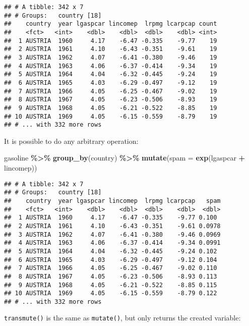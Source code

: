 \documentclass[
]{article}
\newenvironment{Shaded}{\begin{snugshade}}{\end{snugshade}}
\newcommand{\DataTypeTok}[1]{\textcolor[rgb]{0.13,0.29,0.53}{#1}}
\newcommand{\KeywordTok}[1]{\textcolor[rgb]{0.13,0.29,0.53}{\textbf{#1}}}
\newcommand{\NormalTok}[1]{#1}
\newcommand{\OperatorTok}[1]{\textcolor[rgb]{0.81,0.36,0.00}{\textbf{#1}}}
\newcommand{\StringTok}[1]{\textcolor[rgb]{0.31,0.60,0.02}{#1}}
\begin{document}
\begin{verbatim}
## # A tibble: 342 x 7
## # Groups:   country [18]
##    country  year lgaspcar lincomep  lrpmg lcarpcap count
##    <fct>   <int>    <dbl>    <dbl>  <dbl>    <dbl> <int>
##  1 AUSTRIA  1960     4.17    -6.47 -0.335    -9.77    19
##  2 AUSTRIA  1961     4.10    -6.43 -0.351    -9.61    19
##  3 AUSTRIA  1962     4.07    -6.41 -0.380    -9.46    19
##  4 AUSTRIA  1963     4.06    -6.37 -0.414    -9.34    19
##  5 AUSTRIA  1964     4.04    -6.32 -0.445    -9.24    19
##  6 AUSTRIA  1965     4.03    -6.29 -0.497    -9.12    19
##  7 AUSTRIA  1966     4.05    -6.25 -0.467    -9.02    19
##  8 AUSTRIA  1967     4.05    -6.23 -0.506    -8.93    19
##  9 AUSTRIA  1968     4.05    -6.21 -0.522    -8.85    19
## 10 AUSTRIA  1969     4.05    -6.15 -0.559    -8.79    19
## # ... with 332 more rows
\end{verbatim}

It is possible to do any arbitrary operation:

\begin{Shaded}
\begin{Highlighting}[]
\NormalTok{gasoline }\OperatorTok{\%\textgreater{}\%}
\StringTok{  }\KeywordTok{group\_by}\NormalTok{(country) }\OperatorTok{\%\textgreater{}\%}
\StringTok{  }\KeywordTok{mutate}\NormalTok{(}\DataTypeTok{spam =} \KeywordTok{exp}\NormalTok{(lgaspcar }\OperatorTok{+}\StringTok{ }\NormalTok{lincomep))}
\end{Highlighting}
\end{Shaded}

\begin{verbatim}
## # A tibble: 342 x 7
## # Groups:   country [18]
##    country  year lgaspcar lincomep  lrpmg lcarpcap   spam
##    <fct>   <int>    <dbl>    <dbl>  <dbl>    <dbl>  <dbl>
##  1 AUSTRIA  1960     4.17    -6.47 -0.335    -9.77 0.100 
##  2 AUSTRIA  1961     4.10    -6.43 -0.351    -9.61 0.0978
##  3 AUSTRIA  1962     4.07    -6.41 -0.380    -9.46 0.0969
##  4 AUSTRIA  1963     4.06    -6.37 -0.414    -9.34 0.0991
##  5 AUSTRIA  1964     4.04    -6.32 -0.445    -9.24 0.102 
##  6 AUSTRIA  1965     4.03    -6.29 -0.497    -9.12 0.104 
##  7 AUSTRIA  1966     4.05    -6.25 -0.467    -9.02 0.110 
##  8 AUSTRIA  1967     4.05    -6.23 -0.506    -8.93 0.113 
##  9 AUSTRIA  1968     4.05    -6.21 -0.522    -8.85 0.115 
## 10 AUSTRIA  1969     4.05    -6.15 -0.559    -8.79 0.122 
## # ... with 332 more rows
\end{verbatim}

\texttt{transmute()} is the same as \texttt{mutate()}, but only returns the created variable:
\end{document}
